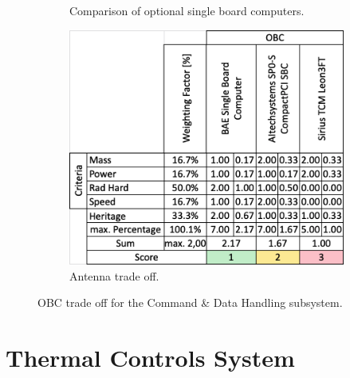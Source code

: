 \begin{figure}[htb]
\begin{subfigure}[b]{0.49\textwidth}
         \caption{Comparison of optional single board computers.}
         \label{fig:Values_Rec}
     \end{subfigure}
     \hfill
     \begin{subfigure}[b]{0.49\textwidth}
         \centering
         \includegraphics[width=\textwidth]{Media/Trade_off/OBC/TradeOff_OBC.png}
         \caption{Antenna trade off.}
         \label{fig:TradeOff_Rec}
     \end{subfigure}
     \hfill
     \caption{OBC trade off for the Command \& Data Handling subsystem.}
     \label{TrOff_Trans}
\end{figure}

\clearpage

\setcounter{figure}{0}
\setcounter{table}{0}

\section{Thermal Controls System} \label{sec:AppendixThermal}
